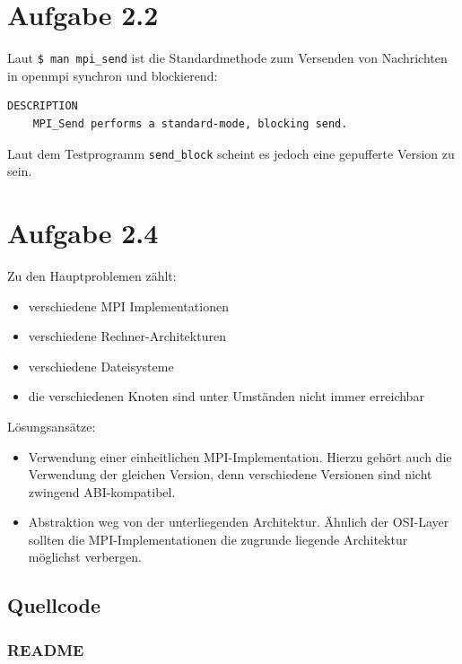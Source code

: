 \documentclass[a4paper,
12pt,
BCOR12mm,
]{scrartcl}
\begin{document}
\section*{Aufgabe 2.2}
Laut \verb|$ man mpi_send| ist die Standardmethode zum Versenden von Nachrichten in
openmpi synchron und blockierend:
\begin{verbatim}
DESCRIPTION
	MPI_Send performs a standard-mode, blocking send.
\end{verbatim}

Laut dem Testprogramm \verb|send_block| scheint es jedoch eine gepufferte Version zu sein.



\section*{Aufgabe 2.4}
Zu den Hauptproblemen zählt:
\begin{itemize}
	\item verschiedene MPI Implementationen
	\item verschiedene Rechner-Architekturen
	\item verschiedene Dateisysteme
	\item die verschiedenen Knoten sind unter Umständen nicht immer erreichbar
\end{itemize}

Lösungsansätze:
\begin{itemize}
	\item Verwendung einer einheitlichen MPI-Implementation. Hierzu gehört auch die
		Verwendung der gleichen Version, denn verschiedene Versionen sind nicht zwingend
		ABI-kompatibel.
	\item Abstraktion weg von der unterliegenden Architektur. Ähnlich der OSI-Layer sollten
	die MPI-Implementationen die zugrunde liegende Architektur möglichst verbergen.
\end{itemize}

%
%
\newpage
\subsection*{Quellcode}
\subsubsection*{README}

\newpage
\end{document}
